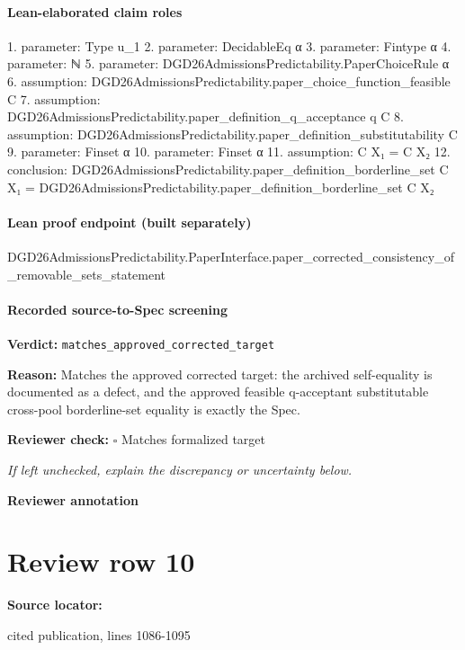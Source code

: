\documentclass[10pt]{article}
\newcommand{\reviewerbox}{%
  \par\noindent\fbox{\parbox{0.96\linewidth}{\rule{0pt}{0.38in}}}\par
}
\newcommand{\reviewmatch}[1]{%
  \par\noindent\textbf{Reviewer check:} $\square$\; #1\par
  \noindent\emph{If left unchecked, explain the discrepancy or uncertainty below.}\par
}
\begin{document}
\paragraph{Lean-elaborated claim roles}\begin{ReviewVerbatim}
1. parameter: Type u_1
2. parameter: DecidableEq α
3. parameter: Fintype α
4. parameter: ℕ
5. parameter: DGD26AdmissionsPredictability.PaperChoiceRule α
6. assumption: DGD26AdmissionsPredictability.paper_choice_function_feasible C
7. assumption: DGD26AdmissionsPredictability.paper_definition_q_acceptance q C
8. assumption: DGD26AdmissionsPredictability.paper_definition_substitutability C
9. parameter: Finset α
10. parameter: Finset α
11. assumption: C X₁ = C X₂
12. conclusion: DGD26AdmissionsPredictability.paper_definition_borderline_set C X₁ =
  DGD26AdmissionsPredictability.paper_definition_borderline_set C X₂
\end{ReviewVerbatim}

\paragraph{Lean proof endpoint (built separately)}\begin{ReviewVerbatim}
DGD26AdmissionsPredictability.PaperInterface.paper_corrected_consistency_of_removable_sets_statement
\end{ReviewVerbatim}

\paragraph{Recorded source-to-Spec screening}
\textbf{Verdict:} \texttt{matches\_approved\_corrected\_target}
\\
{\raggedright
\textbf{Reason:} Matches the approved corrected target:\allowbreak{} the archived self-\allowbreak{}equality is documented as a defect, and the approved feasible q-\allowbreak{}acceptant substitutable cross-\allowbreak{}pool borderline-\allowbreak{}set equality is exactly the Spec.\allowbreak{}
\par}
\reviewmatch{Matches formalized target}
\noindent\textbf{Reviewer annotation}\par
\reviewerbox
\clearpage
\hypertarget{source-claim-7d8732899c3f4210}{}
\section*{Review row 10}
\textbf{Source locator:} {\footnotesize\raggedright cited publication, lines 1086-\allowbreak{}1095\par}
\end{document}
